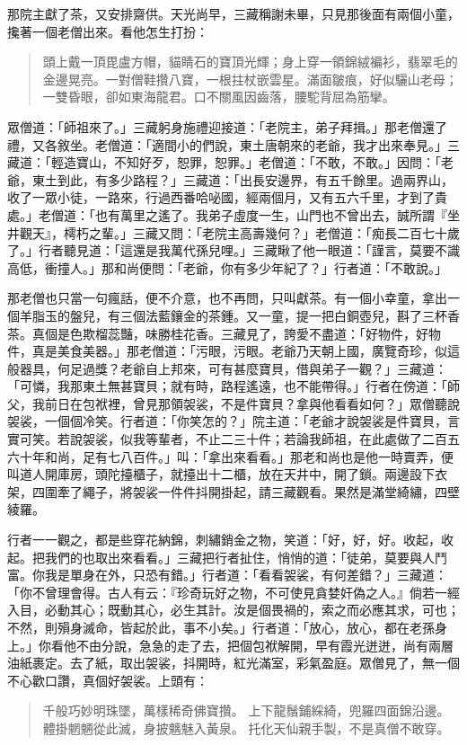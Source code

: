 那院主獻了茶，又安排齋供。天光尚早，三藏稱謝未畢，只見那後面有兩個小童，攙著一個老僧出來。看他怎生打扮：
\begin{quote}
頭上戴一頂毘盧方帽，貓睛石的寶頂光輝；身上穿一領錦絨褊衫，翡翠毛的金邊晃亮。一對僧鞋攢八寶，一根拄杖嵌雲星。滿面皺痕，好似驪山老母；一雙昏眼，卻如東海龍君。口不關風因齒落，腰駝背屈為筋攣。
\end{quote}

眾僧道：「師祖來了。」三藏躬身施禮迎接道：「老院主，弟子拜揖。」那老僧還了禮，又各敘坐。老僧道：「適間小的們說，東土唐朝來的老爺，我才出來奉見。」三藏道：「輕造寶山，不知好歹，恕罪，恕罪。」老僧道：「不敢，不敢。」因問：「老爺，東土到此，有多少路程？」三藏道：「出長安邊界，有五千餘里。過兩界山，收了一眾小徒，一路來，行過西番哈咇國，經兩個月，又有五六千里，才到了貴處。」老僧道：「也有萬里之遙了。我弟子虛度一生，山門也不曾出去，誠所謂『坐井觀天』，樗朽之輩。」三藏又問：「老院主高壽幾何？」老僧道：「痴長二百七十歲了。」行者聽見道：「這還是我萬代孫兒哩。」三藏瞅了他一眼道：「謹言，莫要不識高低，衝撞人。」那和尚便問：「老爺，你有多少年紀了？」行者道：「不敢說。」

那老僧也只當一句瘋話，便不介意，也不再問，只叫獻茶。有一個小幸童，拿出一個羊脂玉的盤兒，有三個法藍鑲金的茶鍾。又一童，提一把白銅壺兒，斟了三杯香茶。真個是色欺榴蕊豔，味勝桂花香。三藏見了，誇愛不盡道：「好物件，好物件，真是美食美器。」那老僧道：「污眼，污眼。老爺乃天朝上國，廣覽奇珍，似這般器具，何足過獎？老爺自上邦來，可有甚麼寶貝，借與弟子一觀？」三藏道：「可憐，我那東土無甚寶貝；就有時，路程遙遠，也不能帶得。」行者在傍道：「師父，我前日在包袱裡，曾見那領袈裟，不是件寶貝？拿與他看看如何？」眾僧聽說袈裟，一個個冷笑。行者道：「你笑怎的？」院主道：「老爺才說袈裟是件寶貝，言實可笑。若說袈裟，似我等輩者，不止二三十件；若論我師祖，在此處做了二百五六十年和尚，足有七八百件。」叫：「拿出來看看。」那老和尚也是他一時賣弄，便叫道人開庫房，頭陀擡櫃子，就擡出十二櫃，放在天井中，開了鎖。兩邊設下衣架，四圍牽了繩子，將袈裟一件件抖開掛起，請三藏觀看。果然是滿堂綺繡，四壁綾羅。

行者一一觀之，都是些穿花納錦，刺繡銷金之物，笑道：「好，好，好。收起，收起。把我們的也取出來看看。」三藏把行者扯住，悄悄的道：「徒弟，莫要與人鬥富。你我是單身在外，只恐有錯。」行者道：「看看袈裟，有何差錯？」三藏道：「你不曾理會得。古人有云：『珍奇玩好之物，不可使見貪婪奸偽之人。』倘若一經入目，必動其心；既動其心，必生其計。汝是個畏禍的，索之而必應其求，可也；不然，則殞身滅命，皆起於此，事不小矣。」行者道：「放心，放心，都在老孫身上。」你看他不由分說，急急的走了去，把個包袱解開，早有霞光迸迸，尚有兩層油紙裹定。去了紙，取出袈裟，抖開時，紅光滿室，彩氣盈庭。眾僧見了，無一個不心歡口讚，真個好袈裟。上頭有：
\begin{quote}
千般巧妙明珠墜，萬樣稀奇佛寶攢。
上下龍鬚鋪綵綺，兜羅四面錦沿邊。
體掛魍魎從此滅，身披魑魅入黃泉。
托化天仙親手製，不是真僧不敢穿。
\end{quote}

